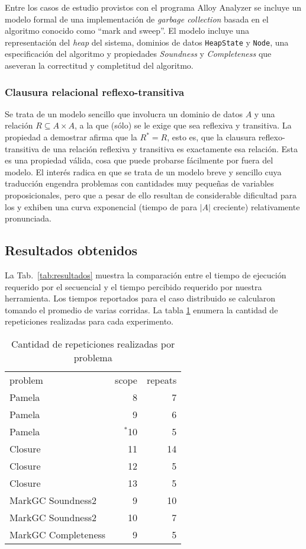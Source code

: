 Entre los casos de estudio provistos con el programa Alloy Analyzer se incluye un modelo formal de una implementación de \emph{garbage collection} basada en el algoritmo conocido como ``mark and sweep''. El modelo incluye una representación del \emph{heap} del sistema, dominios de datos \texttt{HeapState} y \texttt{Node}, una especificación del algoritmo y propiedades \emph{Soundness} y \emph{Completeness} que aseveran la correctitud y completitud del algoritmo.

\subsubsection{Clausura relacional reflexo-transitiva}

Se trata de un modelo sencillo que involucra un dominio de datos $A$ y una relación $R \subseteq A \times A$, a la que (sólo) se le exige que sea reflexiva y transitiva. La propiedad a demostrar afirma que la $R^{*} = R$, esto es, que la clausura reflexo-transitiva de una relación reflexiva y transitiva es exactamente esa relación. Esta es una propiedad válida, cosa que puede probarse fácilmente por fuera del modelo. El interés radica en que se trata de un modelo breve y sencillo cuya traducción engendra problemas con cantidades muy pequeñas de variables proposicionales, pero que a pesar de ello resultan de considerable dificultad para los \ssolvers y exhiben una curva exponencial (tiempo de \solving para $|A|$ creciente) relativamente pronunciada.


\subsection{Resultados obtenidos}


La Tab.~\ref{tab:resultados} muestra la comparación entre el tiempo de
ejecución requerido por el \ssolver secuencial y el tiempo percibido requerido
por nuestra herramienta. Los tiempos reportados para el caso distribuido se
calcularon tomando el promedio de varias corridas. La tabla
\ref{tab:repeticiones} enumera la cantidad de repeticiones realizadas para
cada experimento. 

\begin{table}
	\footnotesize
	\begin{tabular}{lrr}
		\toprule
		problem	&	scope	&	repeats	\\
		\cmidrule(r){1-3}
		Pamela	&	8	&	7	\\
		Pamela	&	9	&	6 \\
		Pamela	&	$^*$10	&	5 \\
		\cmidrule(r){1-3}
		Closure	&	11	&	14	\\
		Closure	&	12	&	5	\\
		Closure	&	13	&	5 \\
		\cmidrule(r){1-3}
		MarkGC Soundness2	&	9	&	10	\\
		MarkGC Soundness2	&	10	&	7	\\
		\cmidrule(r){1-3}
		MarkGC Completeness	&	9	&	5 \\
		\bottomrule
	\end{tabular}
	\caption{Cantidad de repeticiones realizadas por problema}
	\label{tab:repeticiones}
\end{table}


